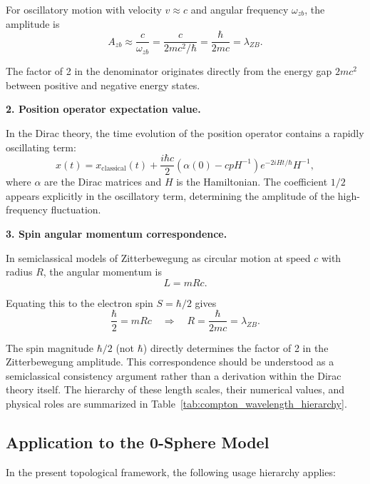 \documentclass[%
 reprint,
 amsmath,amssymb,
 aps,
 prb,
]{revtex4-2}
\numberwithin{equation}{section}
\begin{document}
For oscillatory motion with velocity $v \approx c$ and angular frequency $\omega_{zb}$, the amplitude is
\begin{equation}
A_{zb} \approx \frac{c}{\omega_{zb}} = \frac{c}{2mc^2/\hbar} = \frac{\hbar}{2mc} = \lambda_{ZB}.
\end{equation}

The factor of 2 in the denominator originates directly from the energy gap $2mc^2$ between positive and negative energy states.

\medskip
\noindent\textbf{2. Position operator expectation value.}

In the Dirac theory, the time evolution of the position operator contains a rapidly oscillating term:
\begin{equation}
x(t) = x_{\text{classical}}(t) + \frac{i\hbar c}{2} \left(\alpha(0) - cp H^{-1}\right) e^{-2iHt/\hbar} H^{-1},
\end{equation}
where $\alpha$ are the Dirac matrices and $H$ is the Hamiltonian. The coefficient $1/2$ appears explicitly in the oscillatory term, determining the amplitude of the high-frequency fluctuation.

\medskip
\noindent\textbf{3. Spin angular momentum correspondence.}

In semiclassical models of Zitterbewegung as circular motion at speed $c$ with radius $R$, the angular momentum is
\begin{equation}
L = mRc.
\end{equation}

Equating this to the electron spin $S = \hbar/2$ gives
\begin{equation}
\frac{\hbar}{2} = mRc \quad \Rightarrow \quad R = \frac{\hbar}{2mc} = \lambda_{ZB}.
\end{equation}

The spin magnitude $\hbar/2$ (not $\hbar$) directly determines the factor of 2 in the Zitterbewegung amplitude. This correspondence should be understood as a semiclassical consistency argument rather than a derivation within the Dirac theory itself. The hierarchy of these length scales, their numerical values, and physical roles are summarized in Table~\ref{tab:compton_wavelength_hierarchy}.


\subsection{Application to the 0-Sphere Model}

In the present topological framework, the following usage hierarchy applies:
\end{document}
